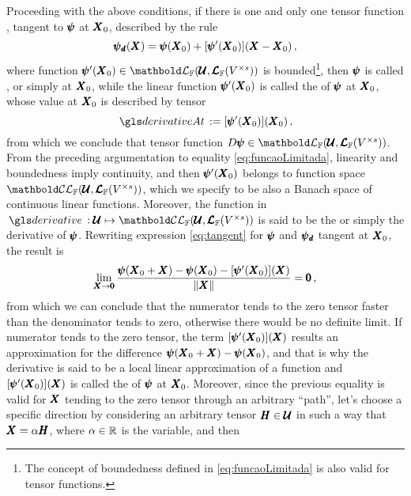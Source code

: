 Proceeding with the above conditions, if there is one and only one tensor function , tangent to $\pmb{\psi}$ at $\pmb{X}_0$, described by the rule
\begin{equation}\label{eq:tangentFunct}
\pmb{\psi_\mathit{d}}(\pmb{X})=\pmb{\psi}(\pmb{X}_0)+[\pmb{\psi}'(\pmb{X}_0)](\pmb{X}-\pmb{X}_0)\,,
\end{equation}
where function $\fua{\tnr{\psi}'}{\tnr{X}_0}\in\evl{\cam{F}}{\pmb{\mathcal{U}}}{\ete{\cam{F}}{V^{\times s}}}$ is bounded\footnote{The concept of boundedness defined in \eqref{eq:funcaoLimitada} is also valid for tensor functions.}, then $\pmb{\psi}$ is called ,  or simply  at $\pmb{X}_0$, while the linear function $\pmb{\psi}'(\pmb{X}_0)$ is called the  of $\pmb{\psi}$ at $\pmb{X}_0$, whose value at $\pmb{X}_0$ is described by tensor 
\begin{equation}
\gloref{derivativeAt}:=[\fua{\tnr{\psi}'}{\tnr{X}_0}](\tnr{X}_0)\,, 
\end{equation}
from which we conclude that tensor function $D\tnr{\psi}\in\evl{\cam{F}}{\pmb{\mathcal{U}}}{\ete{\cam{F}}{V^{\times s}}}$. From the preceding argumentation to equality \eqref{eq:funcaoLimitada}, linearity and boundedness imply continuity, and then $\pmb{\psi}'(\pmb{X}_0)$ belongs to function space $\evlc{\cam{F}}{\pmb{\mathcal{U}}}{\ete{\cam{F}}{V^{\times s}}}$, which we specify to be also a Banach space of continuous linear functions. Moreover, the function in
$\map{\gloref{derivative}}{\pmb{\mathcal{U}}}{\evlc{\cam{F}}{\pmb{\mathcal{U}}}{\ete{\cam{F}}{V^{\times s}}}}$ is said to be the  or simply the derivative of $\pmb{\psi}$. 
Rewriting expression \eqref{eq:tangent} for $\pmb{\psi}$ and $\pmb{\psi_\mathit{d}}$ tangent at $\pmb{X}_0$, the result is
\begin{equation}\label{eq:preDirect}
\lim_{\pmb{X}\to \pmb{0}} \dfrac{\pmb{\psi}(\pmb{X}_0+\pmb{X})-\pmb{\psi}(\pmb{X}_0)-[\pmb{\psi}'(\pmb{X}_0)](\pmb{X})}{\|\pmb{X}\|}=\pmb{0}\,,
\end{equation}
from which we can conclude that the numerator tends to the zero tensor faster than the denominator tends to zero, otherwise there would be no definite limit. If numerator tends to the zero tensor, the term $[\pmb{\psi}'(\pmb{X}_0)](\pmb{X})$ results an approximation for the difference $\pmb{\psi}(\pmb{X}_0+\pmb{X})-\pmb{\psi}(\pmb{X}_0)$, and that is why the derivative is said to be a local linear approximation of a function and $[\pmb{\psi}'(\pmb{X}_0)](\pmb{X})$ is called the  of $\pmb{\psi}$ at $\pmb{X}_0$. Moreover, since the previous equality is valid for $\pmb{X}$ tending to the zero tensor through an arbitrary ``path'', let's choose a specific direction by considering an arbitrary tensor $\pmb{H}\in\pmb{\mathcal{U}}$ in such a way that $\pmb{X}=\alpha\pmb{H}$, where $\alpha\in\mathbb{R}$ is the variable, and then
